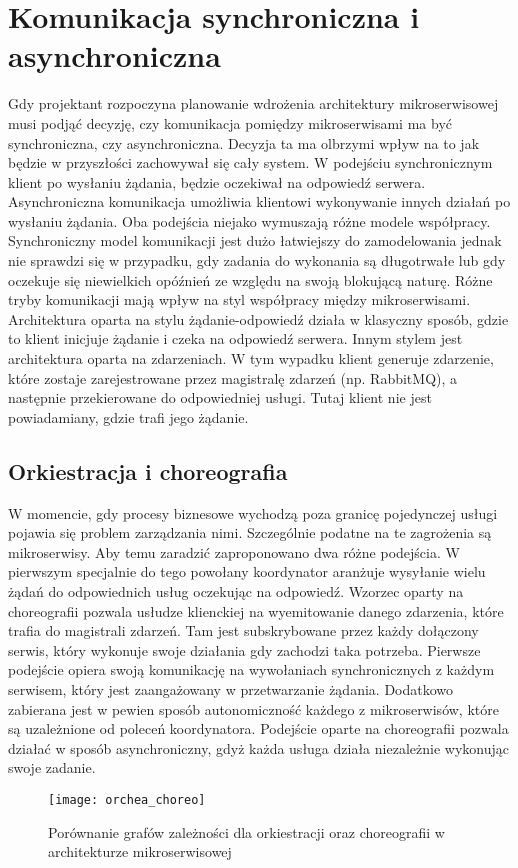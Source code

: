 \section{Komunikacja synchroniczna i asynchroniczna}
Gdy projektant rozpoczyna planowanie wdrożenia architektury mikroserwisowej musi podjąć decyzję, czy komunikacja pomiędzy mikroserwisami ma być synchroniczna, czy asynchroniczna. Decyzja ta ma olbrzymi wpływ na to jak będzie w przyszłości zachowywał się cały system. W podejściu synchronicznym klient po wysłaniu żądania, będzie oczekiwał na odpowiedź serwera. Asynchroniczna komunikacja umożliwia klientowi wykonywanie innych działań po wysłaniu żądania. Oba podejścia niejako wymuszają różne modele współpracy. Synchroniczny model komunikacji jest dużo łatwiejszy do zamodelowania jednak nie sprawdzi się w przypadku, gdy zadania do wykonania są długotrwałe lub gdy oczekuje się niewielkich opóźnień ze względu na swoją blokującą naturę. Różne tryby komunikacji mają wpływ na styl współpracy między mikroserwisami. Architektura oparta na stylu żądanie-odpowiedź działa w klasyczny sposób, gdzie to klient inicjuje żądanie i czeka na odpowiedź serwera. Innym stylem jest architektura oparta na zdarzeniach. W tym wypadku klient generuje zdarzenie, które zostaje zarejestrowane przez magistralę zdarzeń (np. RabbitMQ), a następnie przekierowane do odpowiedniej usługi. Tutaj klient nie jest powiadamiany, gdzie trafi jego żądanie. 
\subsection{Orkiestracja i choreografia}
W momencie, gdy procesy biznesowe wychodzą poza granicę pojedynczej usługi pojawia się problem zarządzania nimi. Szczególnie podatne na te zagrożenia są mikroserwisy. Aby temu zaradzić zaproponowano dwa różne podejścia. W pierwszym specjalnie do tego powołany koordynator aranżuje wysyłanie wielu żądań do odpowiednich usług oczekując na odpowiedź. Wzorzec oparty na choreografii pozwala usłudze klienckiej na wyemitowanie danego zdarzenia, które trafia do magistrali zdarzeń. Tam jest subskrybowane przez każdy dołączony serwis, który wykonuje swoje działania gdy zachodzi taka potrzeba. Pierwsze podejście opiera swoją komunikację na wywołaniach synchronicznych z każdym serwisem, który jest zaangażowany w przetwarzanie żądania. Dodatkowo zabierana jest w pewien sposób autonomiczność każdego z mikroserwisów, które są uzależnione od poleceń koordynatora. Podejście oparte na choreografii pozwala działać w sposób asynchroniczny, gdyż każda usługa działa niezależnie wykonując swoje zadanie.
\begin{figure}[hbt!]
    \caption{Porównanie grafów zależności dla orkiestracji oraz choreografii w architekturze mikroserwisowej}
    \texttt{[image: orchea\_choreo]}
    \centering
\end{figure}